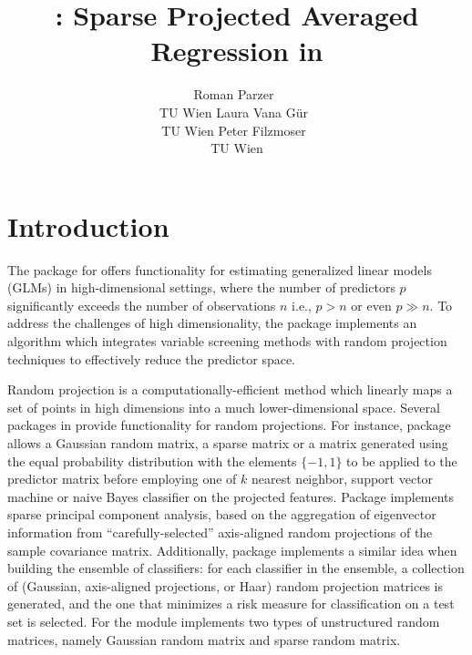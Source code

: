\documentclass[
  article]{jss}
\author{Roman Parzer~\orcidlink{0000-0003-0893-3190}\\TU Wien \And Laura
Vana Gür~\orcidlink{0000-0002-9613-7604}\\TU Wien \AND Peter
Filzmoser~\orcidlink{0000-0002-8014-4682}\\TU Wien}
\title{\pkg{spar}: Sparse Projected Averaged Regression in \proglang{R}}
\begin{document}
\maketitle


\section{Introduction}\label{sec-intro}

The  package for  \citep{RLanguage} offers
functionality for estimating generalized linear models (GLMs) in
high-dimensional settings, where the number of predictors \(p\)
significantly exceeds the number of observations \(n\) i.e., \(p>n\) or
even \(p\gg n\). To address the challenges of high dimensionality, the
package implements an algorithm which integrates variable screening
methods with random projection techniques to effectively reduce the
predictor space.

Random projection is a computationally-efficient method which linearly
maps a set of points in high dimensions into a much lower-dimensional
space. Several packages in  provide functionality for random
projections. For instance, package 
\citep{RandProR, SIDDHARTH2020100629} allows a Gaussian random matrix, a
sparse matrix \citep{ACHLIOPTAS2003JL, LiHastie2006VerySparseRP} or a
matrix generated using the equal probability distribution with the
elements \(\{-1,1\}\) to be applied to the predictor matrix before
employing one of \(k\) nearest neighbor, support vector machine or naive
Bayes classifier on the projected features. Package 
\citep{SPCAvRPR} implements sparse principal component analysis, based
on the aggregation of eigenvector information from
``carefully-selected'' axis-aligned random projections of the sample
covariance matrix. Additionally, package 
\citep{RPEnsembleR} implements a similar idea when building the ensemble
of classifiers: for each classifier in the ensemble, a collection of
(Gaussian, axis-aligned projections, or Haar) random projection matrices
is generated, and the one that minimizes a risk measure for
classification on a test set is selected. For 
\citep{Python} the  module
\citep{pedregosa2011scikit} implements two types of unstructured random
matrices, namely Gaussian random matrix and sparse random matrix.
\end{document}
